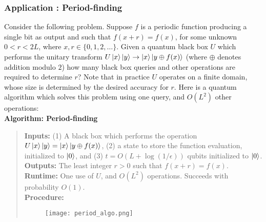 \newpage
\subsubsection{Application : Period-finding}

Consider the following problem. Suppose $f$ is a periodic function producing a single bit as output and such that $f(x + r) = f(x)$, for some unknown $0 < r < 2L$, where $x, r \in \{0, 1, 2, \dots\}$. Given a quantum black box $U$ which performs the unitary transform $U\ket{x}\ket{y} \rightarrow \ket{x}\ket{y \oplus f(x)}$ (where $\oplus$ denotes addition modulo $2$) how many black box queries and other operations are required to determine $r$? Note that in practice $U$ operates on a finite domain, whose size is determined by the desired accuracy for $r$. Here is a quantum algorithm which solves this problem using one query, and $O(L^2)$ other operations:\\
\textbf{Algorithm: Period-finding}
\begin{quote}
    \textbf{Inputs:} (1) A black box which performs the operation $U\ket{x}\ket{y} = \ket{x}\ket{y \oplus f(x)}$, (2) a state to store the function evaluation, initialized to $\ket{0}$, and (3) $t = O(L + \log(1/\epsilon))$ qubits initialized to $\ket{0}$.\\
    \textbf{Outputs:} The least integer $r > 0$ such that $f(x + r) = f(x)$.\\
    \textbf{Runtime:} One use of $U$, and $O(L^2)$ operations. Succeeds with probability $O(1)$.\\
    \textbf{Procedure:}
    \begin{figure}[h]
        \centering
        \texttt{[image: period\_algo.png]}
    \end{figure}
\end{quote}

